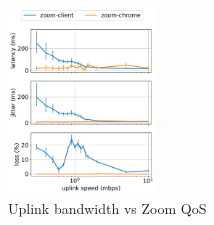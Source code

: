 \begin{figure}[]
    \includegraphics[width=0.35\textwidth,keepaspectratio]{figures/static/uplink_latency_zoom.pdf}
    \caption{Uplink bandwidth vs Zoom QoS}
    \label{fig:latency_video_qual}
\end{figure}

